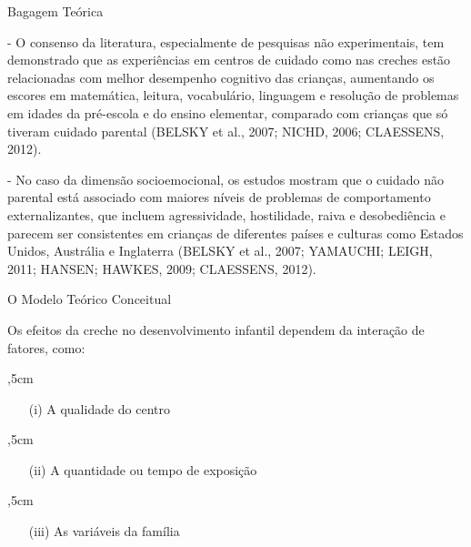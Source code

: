 \documentclass[10pt]{Beamer}
\begin{document}
\begin{frame}{Bagagem Teórica }
	
\begin{tcolorbox}[drop fuzzy shadow=ShadowColor]
- O consenso da literatura, especialmente de pesquisas não experimentais, tem demonstrado que as experiências em centros de cuidado como nas creches estão relacionadas com melhor desempenho cognitivo das crianças, aumentando os escores em matemática, leitura, vocabulário, linguagem e resolução de problemas em idades da pré-escola e do ensino elementar, comparado com crianças que só tiveram cuidado parental (BELSKY et al., 2007; NICHD, 2006; CLAESSENS, 2012).
	
	
- No caso da dimensão socioemocional, os estudos mostram que o cuidado não parental está associado com maiores níveis de problemas de comportamento externalizantes, que incluem agressividade, hostilidade, raiva e desobediência e parecem ser consistentes em crianças de diferentes países e culturas como Estados Unidos, Austrália e Inglaterra (BELSKY et al., 2007; YAMAUCHI; LEIGH, 2011; HANSEN; HAWKES, 2009; CLAESSENS, 2012).
\end{tcolorbox}	

\end{frame}

\begin{frame}{O Modelo Teórico Conceitual}
	
Os efeitos da creche no desenvolvimento infantil dependem da interação de fatores, como:

,5cm


\begin{block}{}
\begin{itemize}
\item[(i)] A qualidade do centro
\end{itemize}	
\end{block}	

,5cm

\begin{block}{}
\begin{itemize}	
\item[(ii)] A quantidade ou tempo de exposição
\end{itemize}
\end{block}

,5cm

\begin{block}{}
\begin{itemize}	
\item[(iii)] As variáveis da família
\end{itemize}
\end{block}

\end{frame}
\end{document}
